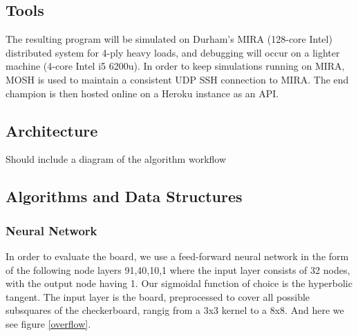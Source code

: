 \documentclass[12pt,a4paper]{article}
\begin{document}
\subsection*{Tools}

The resulting program will be simulated on Durham's MIRA (128-core Intel) distributed system for 4-ply heavy loads, and debugging will occur on a lighter machine (4-core Intel i5 6200u). In order to keep simulations running on MIRA, MOSH is used to maintain a consistent UDP SSH connection to MIRA. The end champion is then hosted online on a Heroku instance as an API.

\subsection*{Architecture}

Should include a diagram of the algorithm workflow

\blindtext
\blindtext

\subsection*{Algorithms and Data Structures}

\subsubsection{Neural Network}

In order to evaluate the board, we use a feed-forward neural network in the form of the following node layers {91,40,10,1} where the input layer consists of 32 nodes, with the output node having 1. Our sigmoidal function of choice is the hyperbolic tangent. The input layer is the board, preprocessed to cover all possible subsquares of the checkerboard, rangig from a 3x3 kernel to a 8x8. And here we see figure \ref{overflow}.
\end{document}
